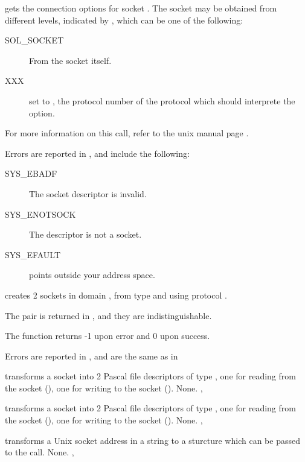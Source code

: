 { gets the connection options for socket .
The socket may be obtained from different levels, indicated by ,
which can be one of the following:
\begin{description}
\item[SOL\_SOCKET] From the socket itself. 
\item[XXX] set  to , the protocol number of the protocol
which should interprete the option.
 \end{description}
For more information on this call, refer to the unix manual page .
}
{Errors are reported in , and include the following:
\begin{description}
\item[SYS\_EBADF] The socket descriptor is invalid.
\item[SYS\_ENOTSOCK] The descriptor is not a socket.
\item[SYS\_EFAULT]  points outside your address space.
\end{description}
}
{}

{ creates 2 sockets in domain , from type
 and using protocol .

The pair is returned in , and they are indistinguishable.

The function returns -1 upon error and 0 upon success.
}
{Errors are reported in , and are the same as in }

{ transforms a socket  into 2 Pascal file
descriptors of type , one for reading from the socket
(), one for writing to the socket ().}
{None.}
{, }

{ transforms a socket  into 2 Pascal file
descriptors of type , one for reading from the socket
(), one for writing to the socket ().}
{None.}
{, }

{ transforms a Unix socket address in a string to a
 sturcture which can be passed to the  call.
}
{None.}
{, }
